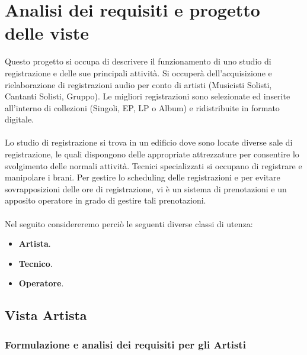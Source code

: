 \documentclass{article}
\begin{document}

\tableofcontents

\newpage
\section{Analisi dei requisiti e progetto delle viste}
Questo progetto si occupa di descrivere il funzionamento di uno studio di registrazione e delle sue principali attività. Si occuperà dell'acquisizione e rielaborazione di registrazioni audio per conto di artisti (Musicisti Solisti, Cantanti Solisti, Gruppo).  Le migliori registrazioni sono selezionate ed inserite all’interno di collezioni (Singoli, EP, LP o Album) e ridistribuite in formato digitale. \\ \\ Lo studio di registrazione si trova in un edificio dove sono locate diverse sale di registrazione, le quali dispongono delle appropriate attrezzature per consentire lo svolgimento delle normali attività. Tecnici specializzati si occupano di registrare e manipolare i brani. Per gestire lo scheduling delle registrazioni e per evitare sovrapposizioni delle ore di registrazione, vi è un sistema di prenotazioni e un apposito operatore in grado di gestire tali prenotazioni. \\ \\
Nel seguito considereremo perciò le seguenti diverse classi di utenza:
\begin{itemize}
    \item \textbf{Artista}.
    \item \textbf{Tecnico}.
    \item \textbf{Operatore}.
\end{itemize}

\newpage
\subsection{Vista Artista}
\subsubsection{Formulazione e analisi dei requisiti per gli Artisti}
\end{document}
